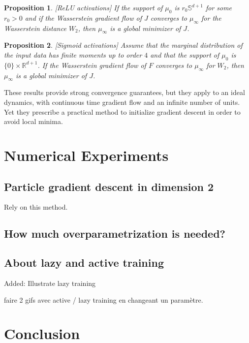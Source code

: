 \documentclass[a4paper, 11pt]{scrartcl}
\newtheorem{proposition}{Proposition}[section]
\begin{document}
\begin{proposition}
\emph{[ReLU activations]}
If the support of $\mu_0$ is $r_0 \mathbb{S}^{d+1}$ for some $r_0>0$ and if the Wasserstein gradient flow of $J$ converges to $\mu_\infty$ for the Wasserstein distance $W_2$, then $\mu_\infty$ is a global minimizer of $J$.
\end{proposition}

\begin{proposition}
\emph{[Sigmoid activations]}
Assume that the marginal distribution of the input data has finite moments up to order $4$ and that the support of $\mu_0$ is $\{0\} \times \mathbb{R}^{d+1}$. If the Wasserstein gradient flow of $F$ converges to $\mu_\infty$ for $W_2$, then $\mu_\infty$ is a global minimizer of $J$.
\end{proposition}

These results provide strong convergence guarantees, but they apply to an ideal dynamics, with continuous time gradient flow and an infinite number of units. Yet they prescribe a practical method to initialize gradient descent in order to avoid local minima.

\section{Numerical Experiments}

\subsection{Particle gradient descent in dimension 2}

Rely on this method.

\subsection{How much overparametrization is needed?}

\subsection{About lazy and active training}

Added: Illustrate lazy training \cite{chizat:hal-01945578}

faire 2 gifs avec active / lazy training en changeant un paramètre.

\section{Conclusion}
\end{document}
